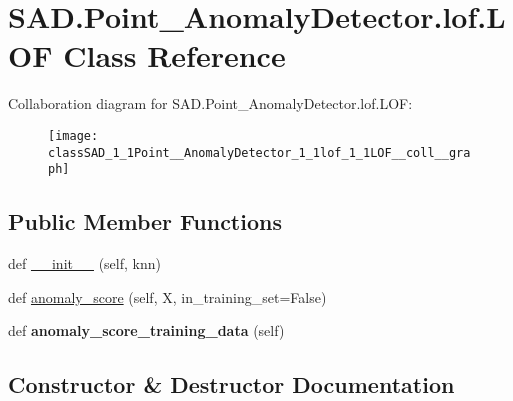 \hypertarget{classSAD_1_1Point__AnomalyDetector_1_1lof_1_1LOF}{}\section{S\+A\+D.\+Point\+\_\+\+Anomaly\+Detector.\+lof.\+L\+OF Class Reference}
\label{classSAD_1_1Point__AnomalyDetector_1_1lof_1_1LOF}


Collaboration diagram for S\+A\+D.\+Point\+\_\+\+Anomaly\+Detector.\+lof.\+L\+OF\+:\nopagebreak
\begin{figure}[H]
\begin{center}
\leavevmode
\texttt{[image: classSAD\_1\_1Point\_\_AnomalyDetector\_1\_1lof\_1\_1LOF\_\_coll\_\_graph]}
\end{center}
\end{figure}
\subsection*{Public Member Functions}
\begin{DoxyCompactItemize}
\item 
def \hyperlink{classSAD_1_1Point__AnomalyDetector_1_1lof_1_1LOF_a69d2963f6872ad3ad242de18d6e13e02}{\+\_\+\+\_\+init\+\_\+\+\_\+} (self, knn)
\item 
def \hyperlink{classSAD_1_1Point__AnomalyDetector_1_1lof_1_1LOF_a1ef7844074fc0eba2712ea9c936f78f0}{anomaly\+\_\+score} (self, X, in\+\_\+training\+\_\+set=False)
\item 
def {\bfseries anomaly\+\_\+score\+\_\+training\+\_\+data} (self)\hypertarget{classSAD_1_1Point__AnomalyDetector_1_1lof_1_1LOF_a900133981aa14fe76708e11ceb845b9e}{}\label{classSAD_1_1Point__AnomalyDetector_1_1lof_1_1LOF_a900133981aa14fe76708e11ceb845b9e}

\end{DoxyCompactItemize}


\subsection{Constructor \& Destructor Documentation}
